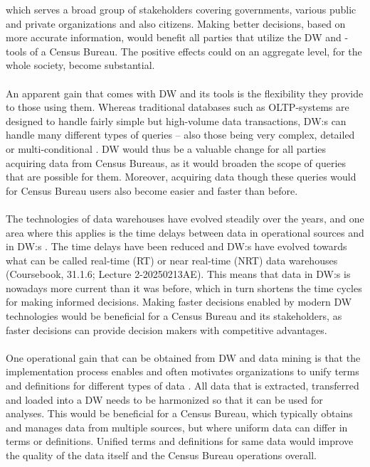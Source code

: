 which serves a broad group of stakeholders covering governments, 
various public and private organizations and also citizens. 
Making better decisions, based on more accurate information, would benefit all parties that utilize the DW and -tools of a Census Bureau. 
The positive effects could on an aggregate level, for the whole society, become substantial.
\\\\
An apparent gain that comes with DW and its tools is the flexibility they provide to those using them. 
Whereas traditional databases such as OLTP-systems are designed to handle fairly simple but high-volume data transactions, DW:s can handle many
different types of queries -- also those being very complex, detailed or multi-conditional \cite[chapter~31.1.4]{CourseLitt}. 
DW would thus be a valuable change for all parties acquiring data from Census Bureaus, 
as it would broaden the scope of queries that are possible for them. 
Moreover, acquiring data though these queries would for Census Bureau users also become easier and faster than before.
\\\\
The technologies of data warehouses have evolved steadily over the years, 
and one area where this applies is the time delays between data in operational sources and in DW:s \cite[chapter~31.1.6]{CourseLitt}. 
The time delays have been reduced and DW:s have evolved towards what can be called real-time (RT) or near real-time (NRT) data warehouses (Coursebook, 31.1.6; Lecture 2-20250213AE). 
This means that data in DW:s is nowadays more current than it was before, 
which in turn shortens the time cycles for making informed decisions. 
Making faster decisions enabled by modern DW technologies would be beneficial for a Census Bureau and its stakeholders, 
as faster decisions can provide decision makers with competitive advantages.
\\\\
One operational gain that can be obtained from DW and data mining is that the implementation process enables and often motivates organizations to
unify terms and definitions for different types of data \cite{l2video}. 
All data that is extracted, transferred and loaded into a DW needs to be harmonized so that it can be used for analyses. 
This would be beneficial for a Census Bureau, which typically obtains and manages data from multiple sources, 
but where uniform data can differ in terms or definitions. 
Unified terms and definitions for same data would improve the quality of the data itself and the Census Bureau operations overall.
